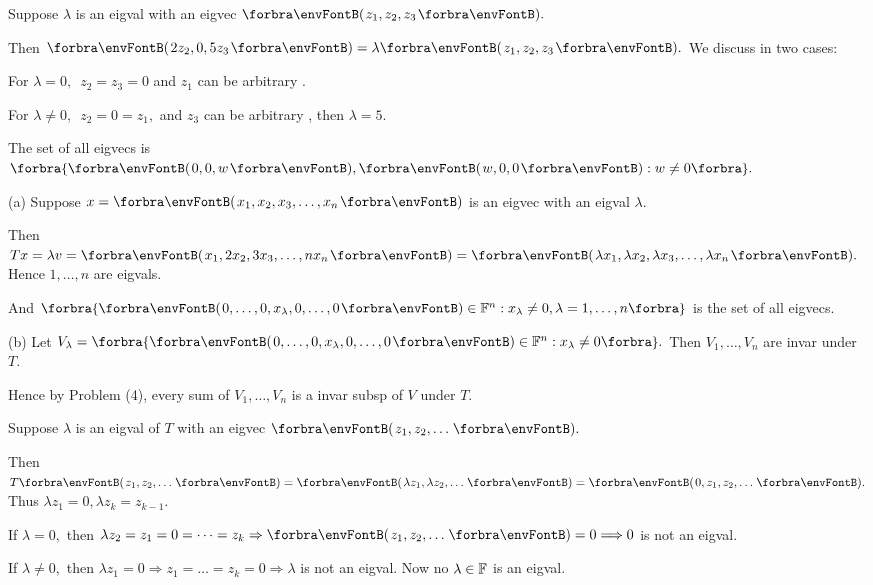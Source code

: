 \documentclass[a4paper, 11pt, UTF8]{article}
\begin{document}
\begin{large}
Suppose $\lambda$ is an eigval with an eigvec $\Par{z_1,z_2,z_3}.$\par
\Blind{\Solution} Then $\Par{2z_2, 0,5z_3}=\lambda\Par{z_1,z_2,z_3}.$ We discuss in two cases:\par
\Blind{\Solution} For $\lambda=0,$\, $z_2=z_3=0$ and $z_1$ can be arbitrary .\par
\Blind{\Solution} For $\lambda\neq 0,$\, $z_2=0=z_1,$ and $z_3$ can be arbitrary , then $\lambda=5$.\par
\Blind{\Solution} The set of all eigvecs is $\Bra{\Par{0,0,w},\Par{w,0,0}:w\neq 0}.$\PfEnd
\SepLine

\par\quad
(a) Suppose $x=\Par{x_1,x_2,x_3,\dots,x_n}$ is an eigvec with an eigval $\lambda.$\par\quad\Ha
Then $Tx=\lambda v=\Par{x_1,2 x_2,3 x_3,\dots,n x_n}=\Par{\lambda x_1,\lambda x_2,\lambda x_3,\dots,\lambda x_n}.$ Hence $1,\dots,n$ are eigvals.\par\quad\Ha
And $\Bra{\Par{0,\dots,0,x_\lambda,0,\dots,0}\in\Fbb^n:x_\lambda\neq 0,\lambda=1,\dots,n}$ is the set of all eigvecs.\par\quad
(b) Let $V_\lambda=\Bra{\Par{0,\dots,0,x_\lambda,0,\dots,0}\in\Fbb^n:x_\lambda\neq 0}.$ Then $V_1,\dots,V_n$ are invar under $T.$\par\quad\Hb
Hence by Problem (4), every sum of $V_1,\dots,V_n$ is a invar subsp of $V$ under $T.$\PfEnd
\par\quad
\SepLine

\par\quad
Suppose $\lambda$ is an eigval of $T$ with an eigvec $\Par{z_1,z_2,\dots}.$\par\quad
Then $T\Par{z_1,z_2,\dots}=\Par{\lambda z_1,\lambda z_2,\dots}=\Par{0,z_1,z_2,\dots}.$ Thus $\lambda z_1=0,\lambda z_k=z_{k-1}.$\par\quad
If $\lambda=0,$ then $\lambda z_2=z_1=0=\dots=z_k\Rightarrow\Par{z_1,z_2,\dots}=0\Longrightarrow0$ is not an eigval.\par\quad
If $\lambda\neq 0,$ then $\lambda z_1=0\Rightarrow z_1=\dots=z_k=0\Longrightarrow\lambda$ is not an eigval. Now no $\lambda\in{\mathbb{F}}$ is an eigval.\PfEnd
\SepLine


\end{large}
\end{document}
